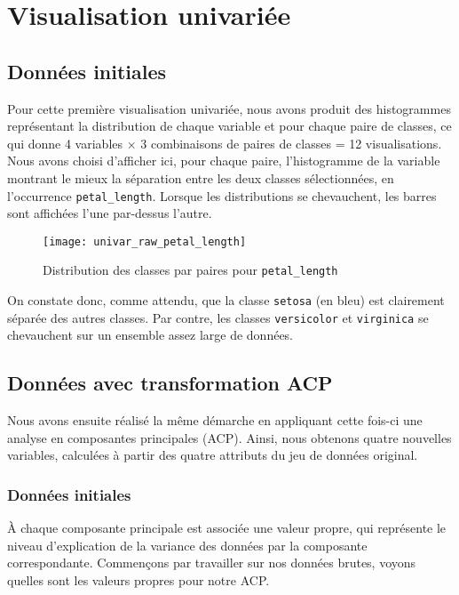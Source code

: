 \documentclass[french]{report}
\begin{document}
    \chapter{Visualisation univariée}
    
    \section{Données initiales}
    
    Pour cette première visualisation univariée, nous avons produit des histogrammes représentant la distribution de chaque variable et pour chaque paire de classes, ce qui donne 4 variables $\times$ 3 combinaisons de paires de classes = 12 visualisations.
    Nous avons choisi d'afficher ici, pour chaque paire, l'histogramme de la variable montrant le mieux la séparation entre les deux classes sélectionnées, en l'occurrence \texttt{petal\_length}.
    Lorsque les distributions se chevauchent, les barres sont affichées l'une par-dessus l'autre.
    
    \begin{figure}[h]
        \centering
        \texttt{[image: univar\_raw\_petal\_length]}
        \caption{Distribution des classes par paires pour \texttt{petal\_length}}
    \end{figure}
    
    On constate donc, comme attendu, que la classe \texttt{setosa} (en bleu) est clairement séparée des autres classes.
    Par contre, les classes \texttt{versicolor} et \texttt{virginica} se chevauchent sur un ensemble assez large de données.

    \section{Données avec transformation ACP}
    
    Nous avons ensuite réalisé la même démarche en appliquant cette fois-ci une analyse en composantes principales (ACP).
    Ainsi, nous obtenons quatre nouvelles variables, calculées à partir des quatre attributs du jeu de données original.
    
    \subsection{Données initiales}
    
    À chaque composante principale est associée une valeur propre, qui représente le niveau d'explication de la variance des données par la composante correspondante.
    Commençons par travailler sur nos données brutes, voyons quelles sont les valeurs propres pour notre ACP.
    
\end{document}
